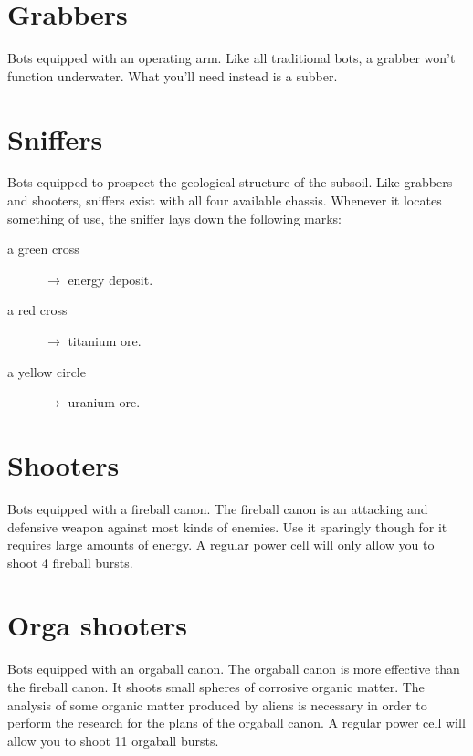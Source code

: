 \section{Grabbers}

Bots equipped with an operating arm. Like all traditional bots, a grabber won't function underwater. What you'll need instead is a subber.


\section{Sniffers}

Bots equipped to prospect the geological structure of the subsoil. Like grabbers and shooters, sniffers exist with all four available chassis. Whenever it locates something of use, the sniffer lays down the following marks:

\begin{description}
    \item[a green cross] $\rightarrow$ energy deposit.
    \item[a red cross] $\rightarrow$ titanium ore.
    \item[a yellow circle] $\rightarrow$ uranium ore.
\end{description}


\section{Shooters}

Bots equipped with a fireball canon. The fireball canon is an attacking and defensive weapon against most kinds of enemies. Use it sparingly though for it requires large amounts of energy. A regular power cell will only allow you to shoot 4 fireball bursts.


\section{Orga shooters}

Bots equipped with an orgaball canon. The orgaball canon is more effective than the fireball canon. It shoots small spheres of corrosive organic matter. The analysis of some organic matter produced by aliens is necessary in order to perform the research for the plans of the orgaball canon. A regular power cell will allow you to shoot 11 orgaball bursts.